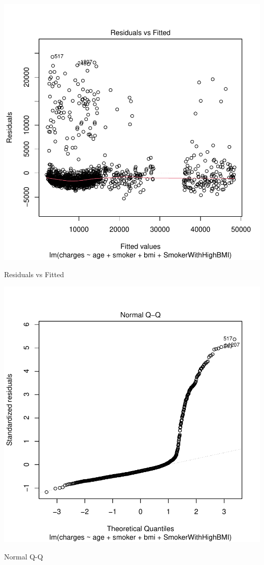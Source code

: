 \documentclass{article}
\begin{document}
\begin{centerfig}
\includegraphics{Untitled-059}
\caption{Residuals vs Fitted}
\end{centerfig}

\begin{centerfig}
\includegraphics{Untitled-060}
\caption{Normal Q-Q}
\end{centerfig}
\end{document}
